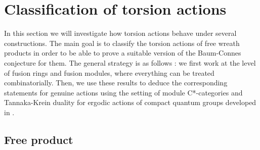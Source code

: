 \documentclass[a4paper, 11pt]{amsart}
\theoremstyle{plain}
\theoremstyle{definition}
\theoremstyle{remark}
\begin{document}
\section{Classification of torsion actions}\label{sec:torsion}

In this section we will investigate how torsion actions behave under several constructions. The main goal is to classify the torsion actions of free wreath products in order to be able to prove a suitable version of the Baum-Connes conjecture for them. The general strategy is as follows : we first work at the level of fusion rings and fusion modules, where everything can be treated combinatorially. Then, we use these results to deduce the corresponding statements for genuine actions using the setting of module C*-categories and Tannaka-Krein duality for ergodic actions of compact quantum groups developed in \cite{de2013tannaka}.

\subsection{Free product}
\end{document}
